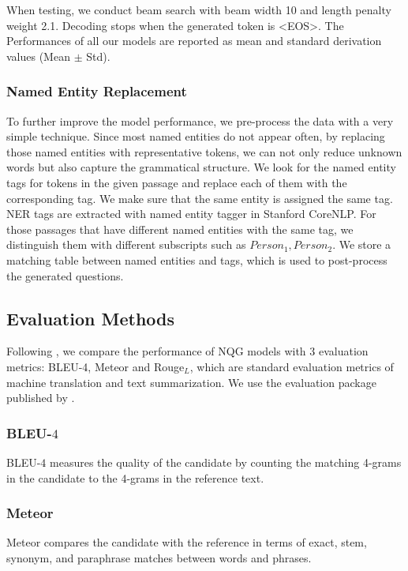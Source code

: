 \documentclass[letterpaper]{article} %
\begin{document}
When testing, we conduct beam search with beam width 10 and length penalty weight 2.1. Decoding stops when the generated token is  \textless EOS\textgreater{}. The Performances of all our models are reported as mean and standard derivation values (Mean $\pm$ Std).



\subsubsection{Named Entity Replacement}
To further improve the model performance, we pre-process the data with a very simple technique. Since most named entities do not appear often, by replacing those named entities with representative tokens, we can not only reduce unknown words but also capture the grammatical structure. We look for the named entity tags for tokens in the given passage and replace each of them with the corresponding tag. We make sure that the same entity is assigned the same tag. NER tags are extracted with named entity tagger in Stanford CoreNLP. For those passages that have different named entities with the same tag, we distinguish them with different subscripts such as \(Person_1, Person_2\). We store a matching table between named entities and tags, which is used to post-process the generated questions.



\subsection{Evaluation Methods}
Following \cite{zhou2017neural,song2018leveraging}, we compare the performance of NQG models with 3 evaluation metrics: BLEU-4, Meteor and Rouge\(_L\), which are standard evaluation metrics of machine translation and text summarization. We use the evaluation package published by \cite{chen2015microsoft}.

\subsubsection{BLEU-\(4\)}
BLEU-\(4\) measures the quality of the candidate by counting the matching 4-grams in the candidate to the 4-grams in the reference text.

\subsubsection{Meteor}
Meteor compares the candidate with the reference in terms of exact, stem, synonym, and paraphrase matches between words and phrases.
\end{document}
